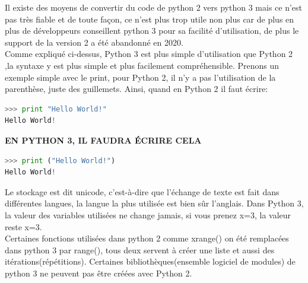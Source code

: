 \documentclass[a4paper, 12pt]{article}
\numberwithin{equation}{subsection}
\begin{document}
	Il existe des moyens de convertir du code de python 2 vers python 3 mais ce n’est pas très fiable et de toute façon, ce n’est plus trop utile non plus car de plus en plus de développeurs conseillent python 3 pour sa facilité d’utilisation, de plus le support de la version 2 a été abandonné en 2020.\\

	Comme expliqué ci-dessus, Python 3 est plus simple d’utilisation que Python 2 ,la syntaxe y est plus simple et plus facilement compréhensible. Prenons un exemple simple avec le print, pour Python 2, il n’y a pas l’utilisation de la parenthèse, juste des guillemets. Ainsi, quand en Python 2 il faut écrire:\\
 
\begin{lstlisting}[language=Python]
>>> print "Hello World!"
Hello World!
\end{lstlisting}

\textbf{EN PYTHON 3, IL FAUDRA ÉCRIRE CELA}\\
\begin{lstlisting}[language=Python]
>>> print ("Hello World!")
Hello World!
\end{lstlisting}
Le stockage est dit unicode, c'est-à-dire que l’échange de texte est fait dans différentes langues, la langue la plus utilisée est bien sûr l’anglais. Dans Python 3, la valeur des variables utilisées ne change jamais, si vous prenez x=3, la valeur reste x=3. \\

Certaines fonctions utilisées dans python 2 comme xrange() on été remplacées dans python 3 par range(), tous deux servent à créer une liste et aussi des itérations(répétitions). Certaines bibliothèques(ensemble logiciel de modules) de python 3 ne peuvent pas être créées avec Python 2.\\
\end{document}
